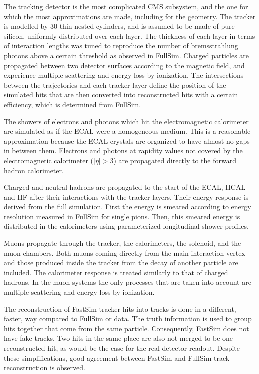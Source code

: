 The tracking detector is the most complicated CMS subsystem, and the one for which the most
approximations are made, including for the geometry.
The tracker is modelled by 30 thin nested cylinders, and is assumed to be made of pure silicon,
uniformly distributed over each layer. The thickness of each layer in terms of interaction lengths
was tuned to reproduce the number of bremsstrahlung photons above a certain threshold as observed in
FullSim.
Charged particles are propagated between two detector surfaces according to the magnetic field, and
experience multiple scattering and energy loss by ionization. The intersections between the
trajectories and each tracker layer define the position of the simulated hits that are then
converted into reconstructed hits with a certain efficiency, which is determined from FullSim. 

The showers of electrons and photons which hit the electromagnetic calorimeter are simulated as if
the ECAL were a homogeneous medium. This is a reasonable approximation because the ECAL crystals
are organized to have almost no gaps in between them. 
Electrons and photons at rapidity values not covered by the electromagnetic calorimeter ($|\eta| >
3$) are propagated directly to the forward hadron calorimeter.

Charged and neutral hadrons are propagated to the start of the ECAL, HCAL and HF after their
interactions with the tracker layers. Their energy response is derived from the full
simulation. First the energy is smeared according to energy resolution measured in FullSim for
single pions. Then, this smeared energy is distributed in the calorimeters using parameterized
longitudinal shower profiles. 

Muons propagate through the tracker, the calorimeters, the solenoid, and the muon chambers. 
Both muons coming directly from the main interaction vertex and those produced inside the
tracker from the decay of another particle are included. 
The calorimeter response is treated similarly to that of charged hadrons. In the muon systems the
only processes that are taken into account are multiple scattering and energy loss by ionization.

The reconstruction of FastSim tracker hits into tracks is done in a different, faster, way compared
to FullSim or data. The truth information is used to group hits together that come from the same
particle. Consequently, FastSim does not have fake tracks. Two hits in the same place are also not
merged to be one reconstructed hit, as would be the case for the real detector readout. 
Despite these simplifications, good agreement between FastSim and FullSim track reconstruction is
observed. 


